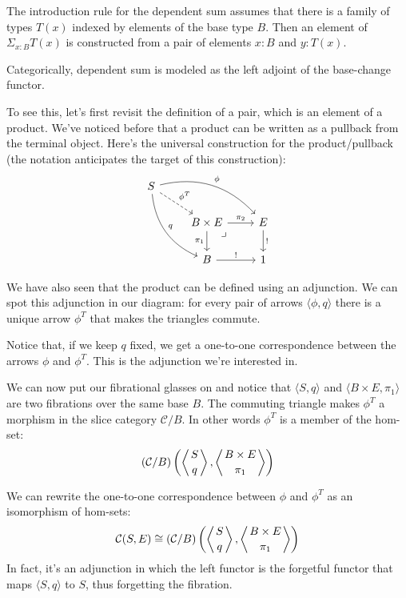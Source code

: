 \documentclass[DaoFP]{subfiles}
\begin{document}
The introduction rule for the dependent sum assumes that there is a family of types $T(x)$ indexed by elements of the base type $B$. Then an element of $\Sigma_{x : B} T(x)$ is constructed from a pair of elements $x \colon B$ and $y \colon T(x)$. 

Categorically, dependent sum is modeled as the left adjoint of the base-change functor. 

To see this, let's first revisit the definition of a pair, which is an element of a product. We've noticed before that a product can be written as a pullback from the terminal object. Here's the universal construction for the product/pullback (the notation anticipates the target of this construction):
\[
 \begin{tikzcd}
 S
 \arrow[dr, dashed, "\phi^T"]
 \arrow[drr, bend left, "\phi"]
 \arrow[ddr, bend right, "q"]
 \\
 &B \times E
\arrow[dr, phantom,  , very near start, "\lrcorner"]
 \arrow[r, "\pi_2"]
 \arrow[d, "\pi_1"']
 &E
 \arrow[d, "!"]
 \\
 &B
 \arrow[r, "!"]
 &1
  \end{tikzcd}
\]

We have also seen that the product can be defined using an adjunction. We can spot this adjunction in our diagram: for every pair of arrows $\langle \phi, q \rangle$ there is a unique arrow $\phi^T$ that makes the triangles commute. 

Notice that, if we keep $q$ fixed, we get a one-to-one correspondence between the arrows $\phi$ and $\phi^T$. This is the adjunction we're interested in.

We can now put our fibrational glasses on and notice that $\langle S, q\rangle$ and $\langle B \times E, \pi_1 \rangle$ are two fibrations over the same base $B$. The commuting triangle makes $\phi^T$ a morphism in the slice category $\mathcal{C}/B$. In other words $\phi^T$ is a member of the hom-set:
 \[ (\mathcal{C}/B) \left(\left \langle {S \atop q} \right \rangle, \left \langle {B \times E \atop \pi_1} \right \rangle \right)  \]
 
 We can rewrite the one-to-one correspondence between $\phi$ and $\phi^T$ as an isomorphism of hom-sets:
\[ \mathcal{C}(S, E) \cong  (\mathcal{C}/B)\left(\left \langle {S \atop q} \right \rangle, \left \langle {B \times E \atop \pi_1} \right \rangle \right)\]
In fact, it's an adjunction in which the left functor is the forgetful functor that maps $\langle S, q \rangle$ to $S$, thus forgetting the fibration.
\end{document}
